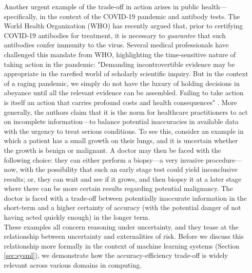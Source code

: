 \documentclass[sigplan,screen]{acmart}
\begin{document}
Another urgent example of the trade-off in action arises in public health---specifically, in the context of the COVID-19 pandemic and antibody tests. The World Health Organization (WHO) has recently argued that, prior to certifying COVID-19 antibodies for treatment, it is necessary to \emph{guarantee} that such antibodies confer immunity to the virus. Several medical professionals have challenged this mandate from WHO, highlighting the time-sensitive nature of taking action in the pandemic: "Demanding incontrovertible evidence may be appropriate in the rarefied world of scholarly scientific inquiry. But in the context of a raging pandemic, we simply do not have the luxury of holding decisions in abeyance until all the relevant evidence can be assembled. Failing to take action is itself an action that carries profound costs and health consequences" \cite{weinstein2020covid}. More generally, the authors claim that it is the norm for healthcare practitioners to act on incomplete information---to balance potential inaccuracies in available data with the urgency to treat serious conditions. To see this, consider an example in which a patient has a small growth on their lungs, and it is uncertain whether the growth is benign or malignant. A doctor may then be faced with the following choice: they can either perform a biopsy---a very invasive procedure---now, with the possibility that such an early stage test could yield inconclusive results; or, they can wait and see if it grows, and then biopsy it at a later stage where there can be more certain results regarding potential malignancy. The doctor is faced with a trade-off between potentially inaccurate information in the short-term and a higher certainty of accuracy (with the potential danger of not having acted quickly enough) in the longer term.
\\

\noindent These examples all concern reasoning under uncertainty, and they tease at the relationship between uncertainty and externalities of risk. Before we discuss this relationship more formally in the context of machine learning systems (Section \ref{sec:sysml}), we demonstrate how the accuracy-efficiency trade-off is widely relevant across various domains in computing.
\end{document}

